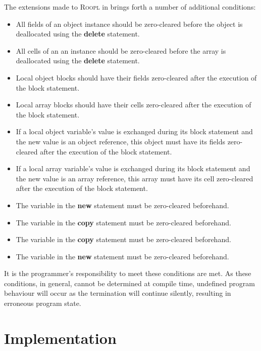 The extensions made to \textsc{Roopl} in \rooplpp brings forth a number of additional conditions:

\begin{itemize}
    \item All fields of an object instance should be zero-cleared before the object is deallocated using the \textbf{delete} statement.
    \item All cells of an an instance should be zero-cleared before the array is deallocated using the \textbf{delete} statement.
    \item Local object blocks should have their fields zero-cleared after the execution of the block statement.
    \item Local array blocks should have their cells zero-cleared after the execution of the block statement.
    \item If a local object variable's value is exchanged during its block statement and the new value is an object reference, this object must have its fields zero-cleared after the execution of the block statement.
    \item If a local array variable's value is exchanged during its block statement and the new value is an array reference, this array must have its cell zero-cleared after the execution of the block statement.
    \item The variable in the \textbf{new} statement must be zero-cleared beforehand.
    \item The variable in the \textbf{copy} statement must be zero-cleared beforehand.
    \item The variable in the \textbf{copy} statement must be zero-cleared beforehand.    \item The variable in the \textbf{new} statement must be zero-cleared beforehand.
\end{itemize}

It is the programmer's responsibility to meet these conditions are met. As these conditions, in general, cannot be determined at compile time, undefined program behaviour will occur as the termination will continue silently, resulting in erroneous program state.


\section{Implementation}
\label{sec:implementation}
